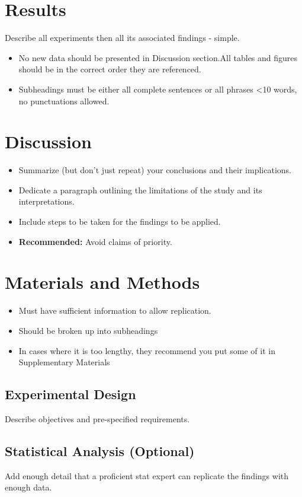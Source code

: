 \documentclass{article}
\begin{document}
	\section{Results}
	Describe all experiments then all its associated findings - simple.
	
	
	\begin{itemize}
		\item No new data should be presented in Discussion section.All tables and figures should be in the correct order they are referenced. 
		\item Subheadings must be either all complete sentences or all phrases \textless 10 words, no punctuations allowed.
	\end{itemize}
	
	\section{Discussion}
	\begin{itemize}
		\item Summarize (but don't just repeat) your conclusions and their implications.
		\item Dedicate a paragraph outlining the limitations of the study and its interpretations.
		\item Include steps to be taken for the findings to be applied.
		\item \textbf{Recommended:} Avoid claims of priority.  
	\end{itemize}
	
	
	\section{Materials and Methods}
	
	\begin{itemize}
		\item Must have sufficient information to allow replication.
		\item Should be broken up into subheadings
		\item In cases where it is too lengthy, they recommend you put some of it in Supplementary Materials
	\end{itemize}
	
	
	\subsection{Experimental Design}
	Describe objectives and pre-specified requirements.
	
	\subsection{Statistical Analysis (Optional)}
	Add enough detail that a proficient stat expert can replicate the findings with enough data.
	
\end{document}
